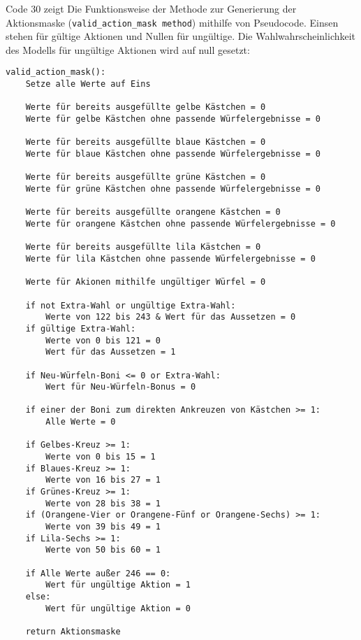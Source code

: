 Code 30 zeigt Die Funktionsweise der Methode zur Generierung der Aktionsmaske (\texttt{valid\_action\_mask method}) mithilfe von Pseudocode. Einsen stehen für gültige Aktionen und Nullen für ungültige. Die Wahlwahrscheinlichkeit des Modells für ungültige Aktionen wird auf null gesetzt:
\vspace{0.5cm}
\begin{lstlisting}[caption={Methode zur Generierung der Aktionsmaske}]
valid_action_mask():
	Setze alle Werte auf Eins
	
	Werte für bereits ausgefüllte gelbe Kästchen = 0
	Werte für gelbe Kästchen ohne passende Würfelergebnisse = 0
	
	Werte für bereits ausgefüllte blaue Kästchen = 0
	Werte für blaue Kästchen ohne passende Würfelergebnisse = 0
	
	Werte für bereits ausgefüllte grüne Kästchen = 0
	Werte für grüne Kästchen ohne passende Würfelergebnisse = 0
	
	Werte für bereits ausgefüllte orangene Kästchen = 0
	Werte für orangene Kästchen ohne passende Würfelergebnisse = 0
	
	Werte für bereits ausgefüllte lila Kästchen = 0
	Werte für lila Kästchen ohne passende Würfelergebnisse = 0
	
	Werte für Akionen mithilfe ungültiger Würfel = 0
	
	if not Extra-Wahl or ungültige Extra-Wahl:
		Werte von 122 bis 243 & Wert für das Aussetzen = 0
	if gültige Extra-Wahl:
		Werte von 0 bis 121 = 0
		Wert für das Aussetzen = 1
	
	if Neu-Würfeln-Boni <= 0 or Extra-Wahl:
		Wert für Neu-Würfeln-Bonus = 0
	
	if einer der Boni zum direkten Ankreuzen von Kästchen >= 1:
		Alle Werte = 0
	
	if Gelbes-Kreuz >= 1:
		Werte von 0 bis 15 = 1
	if Blaues-Kreuz >= 1:
		Werte von 16 bis 27 = 1
	if Grünes-Kreuz >= 1:
		Werte von 28 bis 38 = 1
	if (Orangene-Vier or Orangene-Fünf or Orangene-Sechs) >= 1:
		Werte von 39 bis 49 = 1
	if Lila-Sechs >= 1:
		Werte von 50 bis 60 = 1
	
	if Alle Werte außer 246 == 0:
		Wert für ungültige Aktion = 1
	else:
		Wert für ungültige Aktion = 0
	
	return Aktionsmaske
\end{lstlisting}

